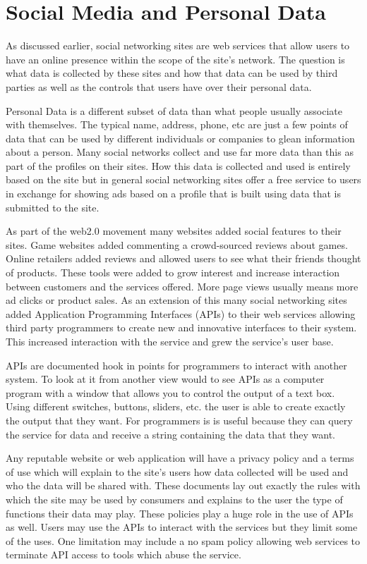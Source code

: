 \section{Social Media and Personal Data}
As discussed earlier, social networking sites are web services that allow users
to have an online presence within the scope of the site's network. The question
is what data is collected by these sites and how that data can be used by third
parties as well as the controls that users have over their personal data.

Personal Data is a different subset of data than what people usually associate
with themselves. The typical name, address, phone, etc are just a few points of data
that can be used by different individuals or companies to glean information
about a person. Many social networks collect and use far more data than this as
part of the profiles on their sites. How this data is collected and used is
entirely based on the site but in general social networking sites offer a free
service to users in exchange for showing ads based on a profile that is built
using data that is submitted to the site.

As part of the web2.0 movement many websites added social features to their
sites. Game websites added commenting a crowd-sourced reviews about games. Online
retailers added reviews and allowed users to see what their friends thought of
products. These tools were added to grow interest and increase interaction
between customers and the services offered. More page views usually means more
ad clicks or product sales. As an extension of this many social networking sites
added Application Programming Interfaces (APIs) to their web services allowing
third party programmers to create new and innovative interfaces to their system.
This increased interaction with the service and grew the service's user base.

APIs are documented hook in points for programmers to interact with another
system. To look at it from another view would to see APIs as a computer program
with a window that allows you to control the output of a text box. Using
different switches, buttons, sliders, etc. the user is able to create exactly
the output that they want. For programmers is is useful because they can query
the service for data and receive a string containing the data that they want.

Any reputable website or web application will have a privacy policy and a terms
of use which will explain to the site's users how data collected will be used
and who the data will be shared with. These documents lay out exactly the rules
with which the site may be used by consumers and explains to the user the type
of functions their data may play. These policies play a huge role in the use of
APIs as well. Users may use the APIs to interact with the services but they
limit some of the uses. One limitation may include a no spam policy allowing web
services to terminate API access to tools which abuse the service.

